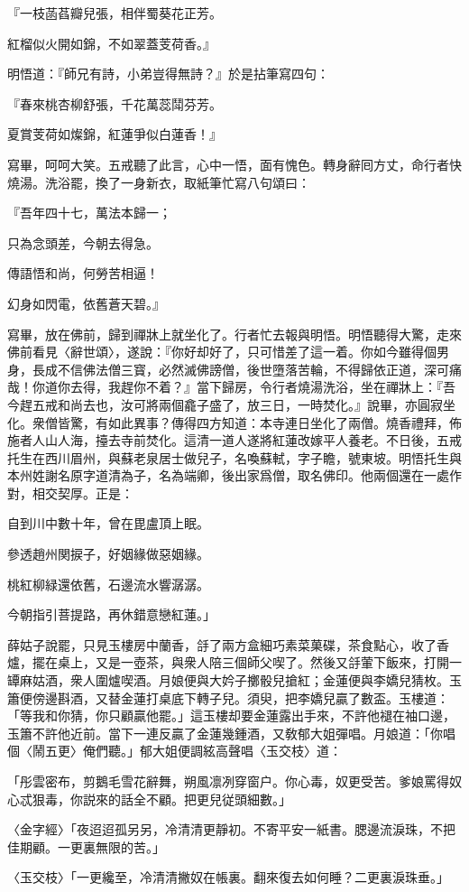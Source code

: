 \begin{myquote}[\markfont]
{\kaishu
『一枝菡萏瓣兒張，相伴蜀葵花正芳。

紅榴似火開如錦，不如翠蓋芰荷香。』
}

明悟道：『師兄有詩，小弟豈得無詩？』於是拈筆寫四句：

{\kaishu
『春來桃杏柳舒張，千花萬蕊鬦芬芳。

夏賞芰荷如燦錦，紅蓮爭似白蓮香！』
}

寫畢，呵呵大笑。五戒聽了此言，心中一悟，面有愧色。轉身辭囘方丈，命行者快燒湯。洗浴罷，換了一身新衣，取紙筆忙寫八句頌曰：

{\kaishu
『吾年四十七，萬法本歸一；

只為念頭差，今朝去得急。　

傳語悟和尚，何勞苦相逼！

幻身如閃電，依舊蒼天碧。』
}

寫畢，放在佛前，歸到禪牀上就坐化了。行者忙去報與明悟。明悟聽得大驚，走來佛前看見〈辭世頌〉，遂說：『你好却好了，只可惜差了這一着。你如今雖得個男身，長成不信佛法僧三寳，必然滅佛謗僧，後世墮落苦輪，不得歸依正道，深可痛哉！你道你去得，我趕你不着？』當下歸房，令行者燒湯洗浴，坐在禪牀上：『吾今趕五戒和尚去也，汝可將兩個龕子盛了，放三日，一時焚化。』說畢，亦圓寂坐化。衆僧皆驚，有如此異事？傳得四方知道：本寺連日坐化了兩僧。燒香禮拜，佈施者人山人海，擡去寺前焚化。這清一道人遂將紅蓮改嫁平人養老。不日後，五戒托生在西川眉州，與蘇老泉居士做兒子，名喚蘇軾，字子瞻，號東坡。明悟托生與本州姓謝名原字道清為子，名為端卿，後出家爲僧，取名佛印。他兩個還在一處作對，相交契厚。正是：

{\kaishu
自到川中數十年，曾在毘盧頂上眠。

參透趙州関捩子，好姻緣做惡姻緣。

桃紅柳緑還依舊，石邊流水響潺潺。

今朝指引菩提路，再休錯意戀紅蓮。」
}
\end{myquote}

薛姑子說罷，只見玉樓房中蘭香，㧱了兩方盒細巧素菜菓碟，茶食點心，收了香爐，擺在桌上，又是一壺茶，與衆人陪三個師父喫了。然後又㧱葷下飯來，打開一罈麻姑酒，衆人圍爐喫酒。月娘便與大妗子擲骰兒搶紅；金蓮便與李嬌兒猜枚。玉簫便傍邊斟酒，又替金蓮打桌底下轉子兒。須臾，把李嬌兒贏了數盃。玉樓道：「等我和你猜，你只顧贏他罷。」這玉樓却要金蓮露出手來，不許他褪在袖口邊，玉簫不許他近前。當下一連反贏了金蓮幾鍾酒，又敎郁大姐彈唱。月娘道：「你唱個〈鬧五更〉俺們聽。」郁大姐便調絃高聲唱〈玉交枝〉道：

\begin{myquote}
「彤雲密布，剪鵝毛雪花辭舞，朔風凛冽穿窗户。你心毒，奴更受苦。爹娘罵得奴心忒狠毒，你説來的話全不顧。把更兒従頭細數。」

{\markfont〈金字經〉}「夜迢迢孤另另，冷清清更靜初。不寄平安一紙書。腮邊流淚珠，不把佳期顧。一更裏無限的苦。」

{\markfont〈玉交枝〉}「一更纔至，冷清清撇奴在帳裏。翻來復去如何睡？二更裏淚珠垂。」
\end{myquote}

